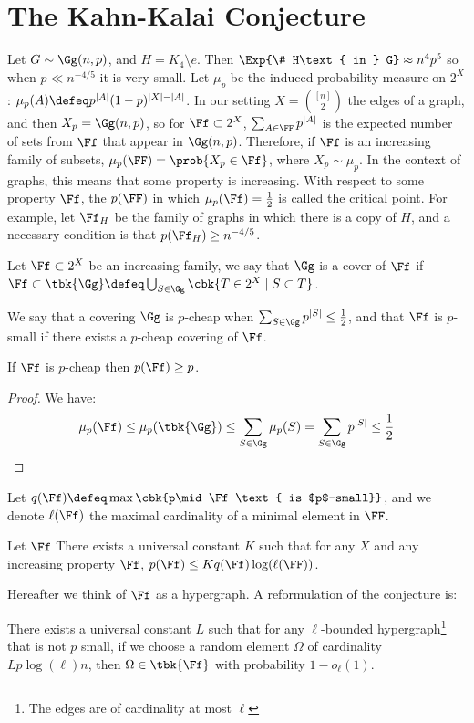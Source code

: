 \documentclass[a4paper, 11pt, oneside]{book}
\begin{document}
\section{The Kahn-Kalai Conjecture}
Let $G\sim \Gg(n,p)$, and $H = K_4\setminus e$. Then $\Exp{\# H\text{ in } G} \approx n^4p^5$ so when $p\ll n^{-4/5}$ it is very small.
Let $\mu_p$ be the induced probability measure on $2^X$: $\mu_p(A) \defeq p^{|A|}(1-p)^{|X|-|A|}$. In our setting $X = {[n]\choose 2}$ the edges of a graph, and then $X_p = \Gg(n,p)$, so for $\Ff\subset 2^X$, $\sum_{A\in \FF} p^{|A|}$ is the expected number of sets from $\Ff$ that appear in $\Gg(n,p)$. Therefore, if $\Ff$ is an increasing family of subsets, $\mu_p(\FF) = \prob{X_p\in \Ff}$, where $X_p\sim \mu_p$. In the context of graphs, this means that some property is increasing. With respect to some property $\Ff$, the $p(\FF)$ in which $\mu_p(\Ff) = \frac{1}{2}$ is called the critical point. For example, let $\Ff_H$ be the family of graphs in which there is a copy of $H$, and a necessary condition is that $p(\Ff_H) \ge n^{-4/5}$.
\begin{defn}
	Let $\Ff\subset 2^X$ be an increasing family, we say that $\Gg$ is a cover of $\Ff$ if $\Ff\subset \tbk{\Gg} \defeq \bigcup_{S\in \Gg}\cbk{T\in 2^X\mid S\subset T}$.
\end{defn}
\begin{defn}
	We say that a covering $\Gg$ is $p$-cheap when $\sum_{S\in \Gg} p^{|S|}\le \frac{1}{2}$, and that $\Ff$ is $p$-small if there exists a $p$-cheap covering of $\Ff$.
\end{defn}
\begin{claim}
	If $\Ff$ is $p$-cheap then $p(\Ff)\ge p$.
\end{claim}
\begin{proof}
	We have:
	\[
	\mu_p(\Ff) \le \mu_p(\tbk{\Gg}) \le \sum_{S\in \Gg} \mu_p(S) = \sum_{S\in \Gg} p^{|S|} \le \frac{1}{2}
	\]
\end{proof}
Let $q(\Ff)\defeq \max\cbk{p\mid \Ff \text{ is $p$-small}}$, and we denote $\ell(\Ff)$ the maximal cardinality of a minimal element in $\FF$.
\begin{conjecture} Let $\Ff$
	There exists a universal constant $K$ such that for any $X$ and any increasing property $\Ff$, $p(\Ff) \le Kq(\Ff)\log(\ell(\FF))$.
\end{conjecture}
Hereafter we think of $\Ff$ as a hypergraph. A reformulation of the conjecture is:
\begin{thm}
	There exists a universal constant $L$ such that for any $\ell$-bounded hypergraph\footnote{The edges are of cardinality at most $\ell$} that is not $p$ small, if we choose a random element $\Omega$ of cardinality $Lp\log(\ell)n$, then $\Omega \in \tbk{\Ff}$ with probability $1-o_\ell(1)$.
\end{thm}
\end{document}
